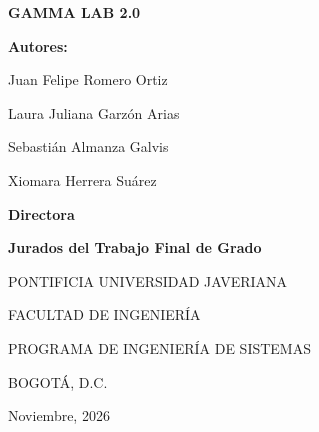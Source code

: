 \documentclass[12pt,letterpaper,oneside]{article}
\DeclareRobustCommand{\_}{\textunderscore\allowbreak}
\newcommand{\tituloProyecto}{GAMMA LAB 2.0}
\newcommand{\autorUno}{Juan Felipe Romero Ortiz}
\newcommand{\autorDos}{Laura Juliana Garzón Arias}
\newcommand{\autorTres}{Sebastián Almanza Galvis}
\newcommand{\autorCuatro}{Xiomara Herrera Suárez}
\newcommand{\universidad}{PONTIFICIA UNIVERSIDAD JAVERIANA}
\newcommand{\facultad}{FACULTAD DE INGENIERÍA}
\newcommand{\programa}{PROGRAMA DE INGENIERÍA DE SISTEMAS}
\newcommand{\ciudad}{BOGOTÁ, D.C.}
\newcommand{\fechaLarga}{Noviembre, 2026}
\begin{document}

\begin{center}
  {\Large\bfseries \tituloProyecto}\par
  \vspace{1.4cm}

  {\bfseries Autores:}\par
  \vspace{0.5cm}
  \autorUno\par
  \autorDos\par
  \autorTres\par
  \autorCuatro\par
  \vspace{1.4cm}

  \leyendaGrado\par
  \vspace{1.4cm}

  {\bfseries Directora}\par
  \vspace{0.4cm}
  \director\par
  \vspace{1.2cm}

  {\bfseries Jurados del Trabajo Final de Grado}\par
  \vspace{0.4cm}
  \juradoUno\par
  \juradoDos\par
  \vspace{1.8cm}

  \universidad\par\vspace{0.6cm}
  \facultad\par\vspace{0.6cm}
  \programa\par\vspace{0.6cm}
  \ciudad\par\vspace{0.6cm}
  \fechaLarga\par
\end{center}
\clearpage
\end{document}
